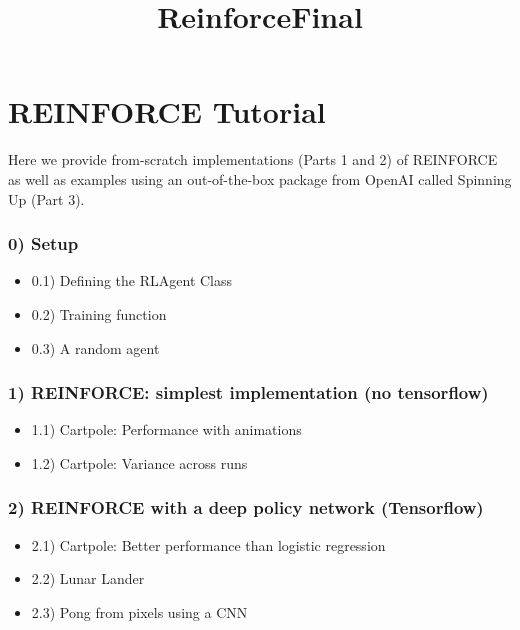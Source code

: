\documentclass[11pt]{article}
\title{ReinforceFinal}
\providecommand{\tightlist}{%
      \setlength{\itemsep}{0pt}\setlength{\parskip}{0pt}}
\begin{document}
    
    
    \maketitle
    
    

    
    \section{REINFORCE Tutorial }\label{reinforce-tutorial}

Here we provide from-scratch implementations (Parts 1 and 2) of
REINFORCE as well as examples using an out-of-the-box package from
OpenAI called Spinning Up (Part 3).

\subsubsection{0) Setup}\label{setup}

\begin{itemize}
\tightlist
\item
  0.1) Defining the RLAgent Class
\item
  0.2) Training function
\item
  0.3) A random agent
\end{itemize}

\subsubsection{ 1) REINFORCE: simplest implementation (no
tensorflow)}\label{reinforce-simplest-implementation-no-tensorflow}

\begin{itemize}
\tightlist
\item
  1.1) Cartpole: Performance with animations
\item
  1.2) Cartpole: Variance across runs
\end{itemize}

\subsubsection{ 2) REINFORCE with a deep policy network
(Tensorflow)}\label{reinforce-with-a-deep-policy-network-tensorflow}

\begin{itemize}
\tightlist
\item
  2.1) Cartpole: Better performance than logistic regression
\item
  2.2) Lunar Lander
\item
  2.3) Pong from pixels using a CNN
\end{itemize}
\end{document}
